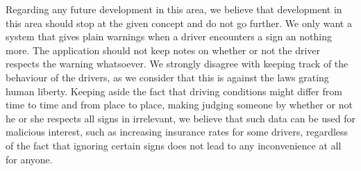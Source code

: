 \documentclass[runningheads,a4paper,11pt]{report}
\begin{document}
Regarding any future development in this area, we believe that development in this area should stop at the given concept and do not go further. We only want a system that gives plain warnings when a driver encounters a sign an nothing more. The application should not keep notes on whether or not the driver respects the warning whatsoever. We strongly disagree with keeping track of the behaviour of the drivers, as we consider that this is against the laws grating human liberty. Keeping aside the fact that driving conditions might differ from time to time and from place to place, making judging someone by whether or not he or she respects all signs in irrelevant, we believe that such data can be used for malicious interest, such as increasing insurance rates for some drivers, regardless of the fact that ignoring certain signs does not lead to any inconvenience at all for anyone.




\end{document}
